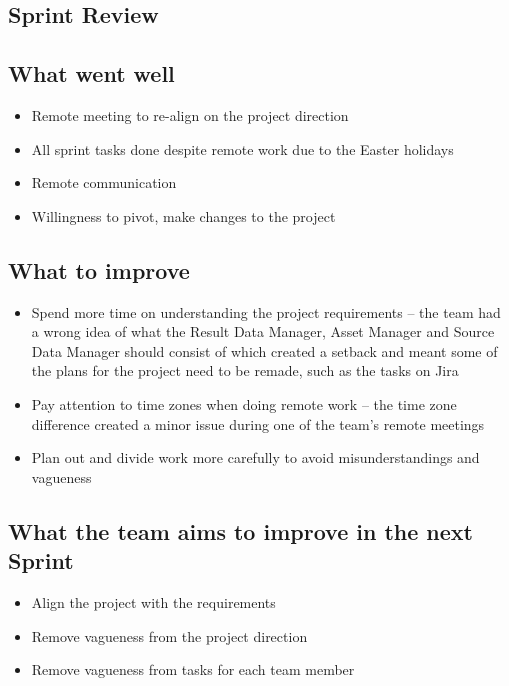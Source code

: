 \documentclass[12pt]{report}
\begin{document}

\subsection*{Sprint Review}

\subsection*{What went well}
\begin{itemize}
    \item Remote meeting to re-align on the project direction
    \item All sprint tasks done despite remote work due to the Easter holidays
    \item Remote communication
    \item Willingness to pivot, make changes to the project
\end{itemize}

\subsection*{What to improve}
\begin{itemize}
    \item Spend more time on understanding the project requirements -- the team had a wrong idea of what the Result Data Manager, Asset Manager and Source Data Manager should consist of which created a setback and meant some of the plans for the project need to be remade, such as the tasks on Jira
    \item Pay attention to time zones when doing remote work -- the time zone difference created a minor issue during one of the team's remote meetings
    \item Plan out and divide work more carefully to avoid misunderstandings and vagueness
\end{itemize}

\subsection*{What the team aims to improve in the next Sprint}
\begin{itemize}
    \item Align the project with the requirements
    \item Remove vagueness from the project direction
    \item Remove vagueness from tasks for each team member
\end{itemize}
\clearpage
\end{document}
